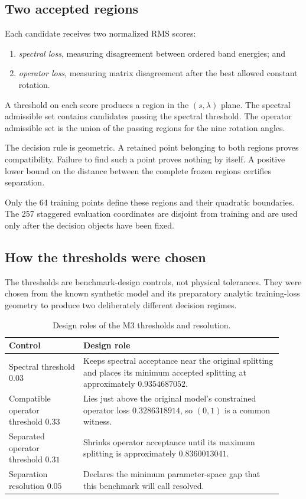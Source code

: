 \subsection{Two accepted regions}

Each candidate receives two normalized RMS scores:
\begin{enumerate}
 \item \emph{spectral loss}, measuring disagreement between ordered band
 energies; and
 \item \emph{operator loss}, measuring matrix disagreement after the best
 allowed constant rotation.
\end{enumerate}
A threshold on each score produces a region in the $(s,\lambda)$ plane. The
spectral admissible set contains candidates passing the spectral threshold. The
operator admissible set is the union of the passing regions for the nine
rotation angles.

The decision rule is geometric. A retained point belonging to both regions
proves compatibility. Failure to find such a point proves nothing by itself. A
positive lower bound on the distance between the complete frozen regions
certifies separation.

Only the 64 training points define these regions and their quadratic
boundaries. The 257 staggered evaluation coordinates are disjoint from training
and are used only after the decision objects have been fixed.

\subsection{How the thresholds were chosen}

The thresholds are benchmark-design controls, not physical tolerances. They
were chosen from the known synthetic model and its preparatory analytic
training-loss geometry to produce two deliberately different decision regimes.

\begin{table}[ht]
\centering
\small
\caption{Design roles of the M3 thresholds and resolution.}
\begin{tabular}{@{}p{0.25\linewidth}p{0.67\linewidth}@{}}
\toprule
Control & Design role \\
\midrule
Spectral threshold $0.03$
 & Keeps spectral acceptance near the original splitting and places its
 minimum accepted splitting at approximately $0.9354687052$. \\
Compatible operator threshold $0.33$
 & Lies just above the original model's constrained operator loss
 $0.3286318914$, so $(0,1)$ is a common witness. \\
Separated operator threshold $0.31$
 & Shrinks operator acceptance until its maximum splitting is approximately
 $0.8360013041$. \\
Separation resolution $0.05$
 & Declares the minimum parameter-space gap that this benchmark will call
 resolved. \\
\bottomrule
\end{tabular}
\end{table}

